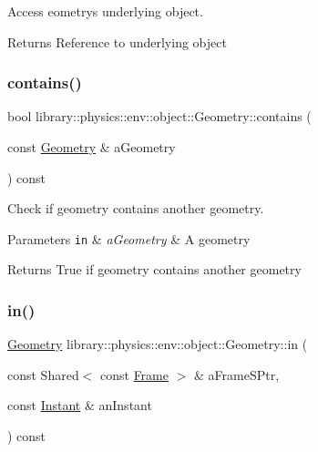 Access eometry\textquotesingle{}s underlying object. 

\begin{DoxyReturn}{Returns}
Reference to underlying object 
\end{DoxyReturn}
\mbox{\label{classlibrary_1_1physics_1_1env_1_1object_1_1_geometry_a9122be6cc4de97bb7aec4ad66bee823d}} 
\subsubsection{\texorpdfstring{contains()}{contains()}}
{\footnotesize\ttfamily bool library\+::physics\+::env\+::object\+::\+Geometry\+::contains (\begin{DoxyParamCaption}\item[{const \hyperlink{classlibrary_1_1physics_1_1env_1_1object_1_1_geometry}{Geometry} \&}]{a\+Geometry }\end{DoxyParamCaption}) const}



Check if geometry contains another geometry. 


\begin{DoxyParams}[1]{Parameters}
\mbox{\tt in}  & {\em a\+Geometry} & A geometry \\
\hline
\end{DoxyParams}
\begin{DoxyReturn}{Returns}
True if geometry contains another geometry 
\end{DoxyReturn}
\mbox{\label{classlibrary_1_1physics_1_1env_1_1object_1_1_geometry_a3538be01a00bf3aae3c1fbc0e7f4fb6b}} 
\subsubsection{\texorpdfstring{in()}{in()}}
{\footnotesize\ttfamily \hyperlink{classlibrary_1_1physics_1_1env_1_1object_1_1_geometry}{Geometry} library\+::physics\+::env\+::object\+::\+Geometry\+::in (\begin{DoxyParamCaption}\item[{const Shared$<$ const \hyperlink{classlibrary_1_1physics_1_1coord_1_1_frame}{Frame} $>$ \&}]{a\+Frame\+S\+Ptr,  }\item[{const \hyperlink{classlibrary_1_1physics_1_1time_1_1_instant}{Instant} \&}]{an\+Instant }\end{DoxyParamCaption}) const}


